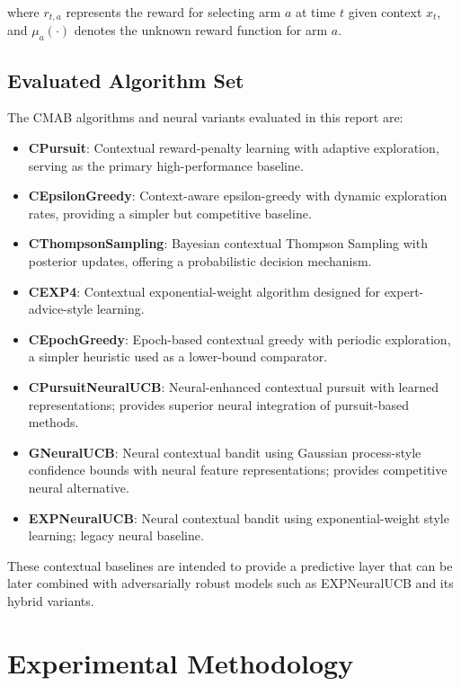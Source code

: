 \documentclass[12pt,a4paper]{article}
\begin{document}
where $r_{t,a}$ represents the reward for selecting arm $a$ at time $t$ given context $x_t$, and $\mu_a(\cdot)$ denotes the unknown reward function for arm $a$.

\subsection{Evaluated Algorithm Set}

The CMAB algorithms and neural variants evaluated in this report are:

\begin{itemize}
\item \textbf{CPursuit}: Contextual reward-penalty learning with adaptive exploration, serving as the primary high-performance baseline.
\item \textbf{CEpsilonGreedy}: Context-aware epsilon-greedy with dynamic exploration rates, providing a simpler but competitive baseline.
\item \textbf{CThompsonSampling}: Bayesian contextual Thompson Sampling with posterior updates, offering a probabilistic decision mechanism.
\item \textbf{CEXP4}: Contextual exponential-weight algorithm designed for expert-advice-style learning.
\item \textbf{CEpochGreedy}: Epoch-based contextual greedy with periodic exploration, a simpler heuristic used as a lower-bound comparator.
\item \textbf{CPursuitNeuralUCB}: Neural-enhanced contextual pursuit with learned representations; provides superior neural integration of pursuit-based methods.
\item \textbf{GNeuralUCB}: Neural contextual bandit using Gaussian process-style confidence bounds with neural feature representations; provides competitive neural alternative.
\item \textbf{EXPNeuralUCB}: Neural contextual bandit using exponential-weight style learning; legacy neural baseline.
\end{itemize}

These contextual baselines are intended to provide a predictive layer that can be later combined with adversarially robust models such as EXPNeuralUCB and its hybrid variants.



\newpage
\section{Experimental Methodology}
\end{document}
